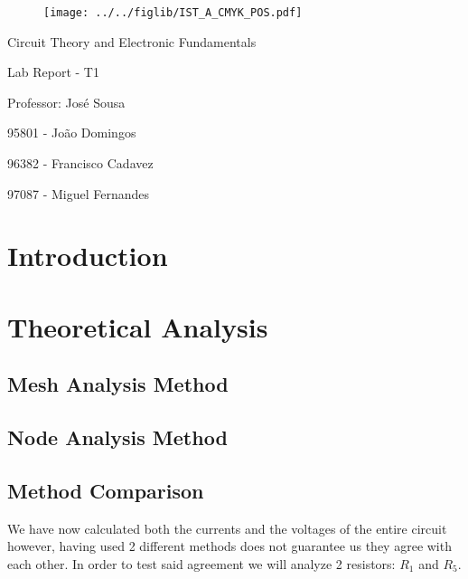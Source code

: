 \documentclass[11pt]{article}
\begin{document}
\thispagestyle{empty}
\begin{figure}[h]
	\centering
	\texttt{[image: ../../figlib/IST\_A\_CMYK\_POS.pdf]}
\end{figure}

\begin{center}
	\huge{Circuit Theory and Electronic Fundamentals}
	
	\huge{Lab Report - T1}
	
	\vspace{30pt}
	
	\large{Professor: José Sousa}
	
	\vspace{20pt}
	
	\large{95801 - João Domingos}
	
	\large{96382 - Francisco Cadavez}
	
	\large{97087 - Miguel Fernandes}
\end{center}

\pagebreak

\tableofcontents

\pagebreak

\section{Introduction}


\pagebreak
\section{Theoretical Analysis}

\subsection{Mesh Analysis Method}


\subsection{Node Analysis Method}


\subsection{Method Comparison}
\hspace{12pt} We have now calculated both the currents and the voltages of the entire circuit however, having used 2 different methods does not guarantee us they agree with each other. In order to test said agreement we will analyze 2 resistors: $R_1$ and $R_5$. \vspace{12pt}
\end{document}
